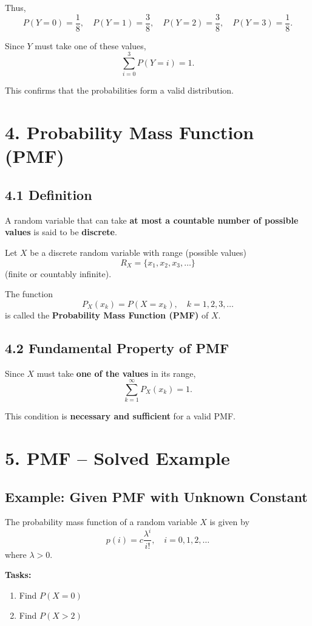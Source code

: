 \documentclass[12pt]{article}
\begin{document}
Thus,
\[
P(Y=0)=\frac{1}{8},\quad
P(Y=1)=\frac{3}{8},\quad
P(Y=2)=\frac{3}{8},\quad
P(Y=3)=\frac{1}{8}.
\]

Since $Y$ must take one of these values,
\[
\sum_{i=0}^{3} P(Y=i) = 1.
\]

This confirms that the probabilities form a valid distribution.

\section*{4. Probability Mass Function (PMF)}

\subsection*{4.1 Definition}

A random variable that can take \textbf{at most a countable number of possible values} is said to be \textbf{discrete}.

Let $X$ be a discrete random variable with range (possible values)
\[
R_X = \{x_1, x_2, x_3, \dots\}
\]
(finite or countably infinite).

The function
\[
P_X(x_k) = P(X = x_k), \quad k = 1,2,3,\dots
\]
is called the \textbf{Probability Mass Function (PMF)} of $X$.

\subsection*{4.2 Fundamental Property of PMF}

Since $X$ must take \textbf{one of the values} in its range,
\[
\sum_{k=1}^{\infty} P_X(x_k) = 1.
\]

This condition is \textbf{necessary and sufficient} for a valid PMF.

\section*{5. PMF – Solved Example}

\subsection*{Example: Given PMF with Unknown Constant}

The probability mass function of a random variable $X$ is given by
\[
p(i) = c \frac{\lambda^i}{i!}, \quad i = 0,1,2,\dots
\]
where $\lambda > 0$.

\textbf{Tasks:}
\begin{enumerate}
\item Find $P(X=0)$
\item Find $P(X>2)$
\end{enumerate}
\end{document}
